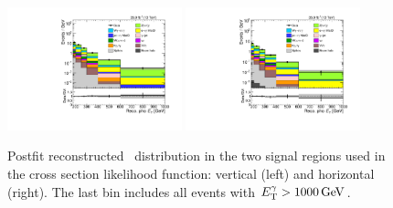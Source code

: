 \begin{figure}[htbp]
  \begin{center}
    \includegraphics[width=0.45\textwidth]{figures/xsec_results/Postfit/postfit_znng_SA_phoPt.pdf}
    \includegraphics[width=0.45\textwidth]{figures/xsec_results/Postfit/postfit_znng_SB_phoPt.pdf}
    \caption{
      Postfit reconstructed \ETgamma\ distribution in the two signal regions used in the cross section likelihood function:
      vertical (left) and horizontal (right). The last bin includes all events with $\ETgamma > 1000\unit{GeV}$.
    }
    \label{fig:postfitXS_SR}
  \end{center}
\end{figure}

